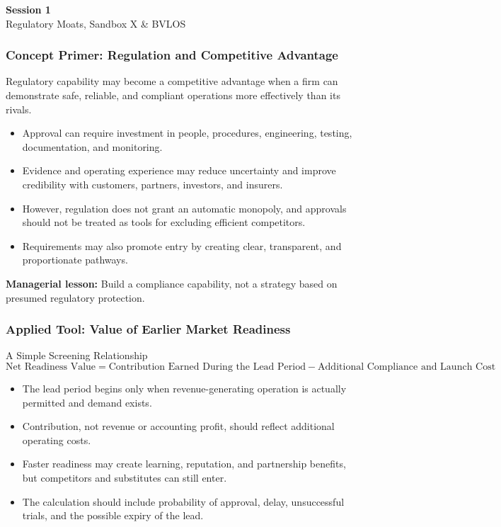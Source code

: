 \documentclass{beamer}
\begin{document}
\begin{frame}[c]
  \begin{center}
    \huge\color{cuhkpurple}\textbf{Session 1}\\
    \vspace{0.5cm}
    \Large Regulatory Moats, Sandbox X \& BVLOS
  \end{center}
\end{frame}

\begin{frame}[t]
\frametitle{Concept Primer: Regulation and Competitive Advantage}
Regulatory capability may become a competitive advantage when a firm can demonstrate safe, reliable, and compliant operations more effectively than its rivals.
\begin{itemize}
\item Approval can require investment in people, procedures, engineering, testing, documentation, and monitoring.
\item Evidence and operating experience may reduce uncertainty and improve credibility with customers, partners, investors, and insurers.
\item However, regulation does not grant an automatic monopoly, and approvals should not be treated as tools for excluding efficient competitors.
\item Requirements may also promote entry by creating clear, transparent, and proportionate pathways.
\end{itemize}
\textbf{Managerial lesson:} Build a compliance capability, not a strategy based on presumed regulatory protection.
\end{frame}

\begin{frame}[t]
\frametitle{Applied Tool: Value of Earlier Market Readiness}
\begin{block}{A Simple Screening Relationship}
\[
\text{Net Readiness Value}
=
\text{Contribution Earned During the Lead Period}
-\text{Additional Compliance and Launch Cost}
\]
\end{block}
\begin{itemize}
\item The lead period begins only when revenue-generating operation is actually permitted and demand exists.
\item Contribution, not revenue or accounting profit, should reflect additional operating costs.
\item Faster readiness may create learning, reputation, and partnership benefits, but competitors and substitutes can still enter.
\item The calculation should include probability of approval, delay, unsuccessful trials, and the possible expiry of the lead.
\end{itemize}
\end{frame}
\end{document}
